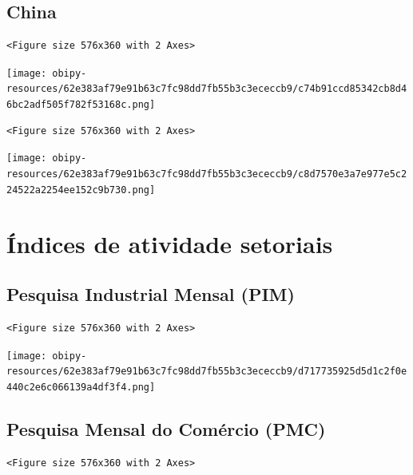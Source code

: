 \documentclass[11pt]{article}
\begin{document}
\subsection{China}
\label{sec:org88076f9}

\begin{verbatim}
<Figure size 576x360 with 2 Axes>
\end{verbatim}


\begin{center}
\texttt{[image: obipy-resources/62e383af79e91b63c7fc98dd7fb55b3c3ececcb9/c74b91ccd85342cb8d46bc2adf505f782f53168c.png]}
\end{center}

\begin{verbatim}
<Figure size 576x360 with 2 Axes>
\end{verbatim}


\begin{center}
\texttt{[image: obipy-resources/62e383af79e91b63c7fc98dd7fb55b3c3ececcb9/c8d7570e3a7e977e5c224522a2254ee152c9b730.png]}
\end{center}


\section{Índices de atividade setoriais}
\label{sec:org5b2f700}



\subsection{Pesquisa Industrial Mensal (PIM)}
\label{sec:orgedfbb85}

\begin{verbatim}
<Figure size 576x360 with 2 Axes>
\end{verbatim}


\begin{center}
\texttt{[image: obipy-resources/62e383af79e91b63c7fc98dd7fb55b3c3ececcb9/d717735925d5d1c2f0e440c2e6c066139a4df3f4.png]}
\end{center}


\subsection{Pesquisa Mensal do Comércio (PMC)}
\label{sec:org3a1d1b5}

\begin{verbatim}
<Figure size 576x360 with 2 Axes>
\end{verbatim}
\end{document}

